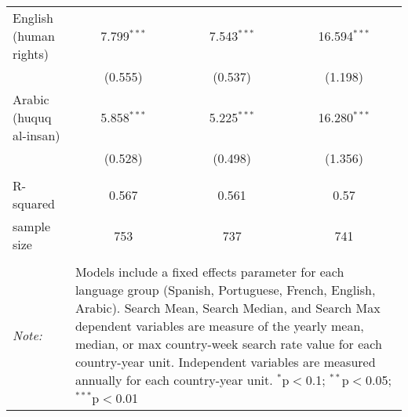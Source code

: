 \begin{table}[!htbp]
\begin{tabular}{@{\extracolsep{5pt}}lccc}
  English (human rights) & 7.799$^{***}$ & 7.543$^{***}$ & 16.594$^{***}$ \\ 
  & (0.555) & (0.537) & (1.198) \\ 
  Arabic (huquq al-insan) & 5.858$^{***}$ & 5.225$^{***}$ & 16.280$^{***}$ \\ 
  & (0.528) & (0.498) & (1.356) \\ 
 \hline \\[-1.8ex] 
R-squared  & 0.567 & 0.561 & 0.57 \\ 
sample size  & 753 & 737 & 741 \\ 
\hline 
\hline \\[-1.8ex] 
\textit{Note:}  & \multicolumn{3}{l}{\parbox[t]{8cm}{Models include a fixed effects parameter for each language group (Spanish, Portuguese, French, English, Arabic). Search Mean, Search Median, and Search Max dependent variables are measure of the yearly mean, median, or max country-week search rate value for each country-year unit. Independent variables are measured annually for each country-year unit. $^{*}$p$<$0.1; $^{**}$p$<$0.05; $^{***}$p$<$0.01}} \\ 
\end{tabular} 
\end{table} 
